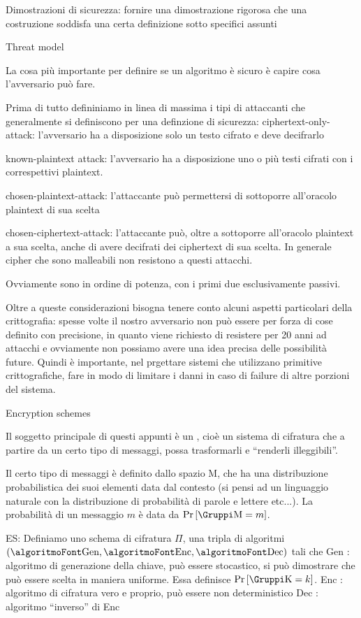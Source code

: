 \voce Dimostrazioni di sicurezza: fornire una dimostrazione rigorosa che una costruzione
soddisfa una certa definizione sotto specifici assunti

\sezione Threat model

La cosa pi\`u importante per definire se un algoritmo \`e sicuro \`e capire
cosa l'avversario pu\`o fare.

Prima di tutto defininiamo in linea di massima i tipi di attaccanti che
generalmente si definiscono per una definzione di sicurezza:
\smallskip
\voce ciphertext-only-attack: l'avversario ha a disposizione solo un testo cifrato
e deve decifrarlo

\voce known-plaintext attack: l'avversario ha a disposizione uno o pi\`u testi cifrati
con i correspettivi plaintext.

\voce chosen-plaintext-attack: l'attaccante pu\`o permettersi di sottoporre all'oracolo
plaintext di sua scelta

\voce chosen-ciphertext-attack: l'attaccante pu\`o, oltre a sottoporre all'oracolo
plaintext a sua scelta, anche di avere decifrati dei ciphertext di sua scelta.
In generale cipher che sono malleabili non resistono a questi attacchi.

Ovviamente sono in ordine di potenza, con i primi due esclusivamente passivi.

Oltre a queste considerazioni bisogna tenere conto alcuni aspetti particolari della crittografia:
spesse volte il nostro avversario non pu\`o essere per forza di cose definito con precisione,
in quanto viene richiesto di resistere per 20 anni ad attacchi e ovviamente non possiamo avere
una idea precisa delle possibilit\`a future. Quindi \`e importante, nel prgettare sistemi che
utilizzano primitive crittografiche, fare in modo di limitare i danni in caso di failure di
altre porzioni del sistema.

\sezione Encryption schemes

Il soggetto principale di questi appunti è un , cio\`e un sistema
di cifratura che a partire da un certo tipo di messaggi, possa trasformarli e ``renderli illeggibili''.

Il certo tipo di messaggi \`e definito dallo spazio \spazio M, che ha una distribuzione probabilistica
dei suoi elementi data dal contesto (si pensi ad un linguaggio naturale con la distribuzione di probabilit\`a
di parole e lettere etc...). La probabilit\`a di un messaggio $m$ \`e data da $\Pr[\gruppo M = m]$.

 ES: Definiamo uno schema di cifratura $\Pi$, una tripla di algoritmi $(\algoritmo Gen , \algoritmo Enc , \algoritmo Dec )$
tali che
\unorderedlist
\li \algoritmo Gen : algoritmo di generazione della chiave, pu\`o essere stocastico, si pu\`o dimostrare
che pu\`o essere scelta in maniera uniforme. Essa definisce $\Pr[\spazio K=k]$.
\li \algoritmo Enc : algoritmo di cifratura vero e proprio, pu\`o essere non deterministico
\li \algoritmo Dec : algoritmo ``inverso'' di \algoritmo Enc
\endunorderedlist

